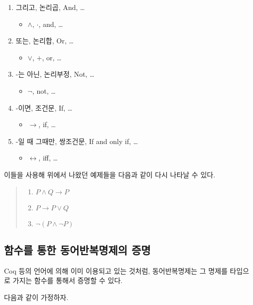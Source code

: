 \documentclass[a4paper, 12pt]{oblivoir}
\begin{document}
\begin{enumerate}
\item 그리고, 논리곱, And, \ldots{}
  \begin{itemize}
  \item $\wedge{}$, $\cdot{}$, and, \ldots{}
  \end{itemize}
\item 또는, 논리합, Or, \ldots{}
  \begin{itemize}
  \item $\vee{}$, $+$, or, \ldots{}
  \end{itemize}
\item \--는 아닌, 논리부정, Not, \ldots{}
  \begin{itemize}
  \item $\neg{}$, not, \ldots{}
  \end{itemize}
\item \--이면, 조건문, If, \ldots{}
  \begin{itemize}
  \item $\rightarrow{}$, if, \ldots{}
  \end{itemize}
\item \--일 때 그때만, 쌍조건문, If and only if, \ldots{}
  \begin{itemize}
  \item $\leftrightarrow{}$, iff, \ldots{}
  \end{itemize}
\end{enumerate}

이들을 사용해 위에서 나왔던 예제들을 다음과 같이 다시 나타날 수 있다.
\begin{quotation}
  \noindent\small
  \begin{enumerate}
  \item $P \wedge{} Q \rightarrow{} P$
  \item $P \rightarrow{} P \vee{} Q$
  \item $\neg{}(P \wedge{} \neg{}P)$
  \end{enumerate}
\end{quotation}


\subsection{함수를 통한 동어반복명제의 증명}
Coq 등의 언어에 의해 이미 이용되고 있는 것처럼,
동어반복명제는 그 명제를 타입으로 가지는 함수를 통해서 증명할 수 있다.

다음과 같이 가정하자.
\end{document}
